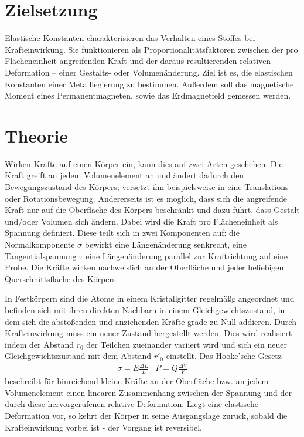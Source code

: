 \section{Zielsetzung}
Elastische Konstanten charakterisieren das Verhalten eines Stoffes bei Krafteinwirkung.
 Sie funktionieren als Proportionalitätsfaktoren zwischen der pro Flächeneinheit angreifenden Kraft und der daraus resultierenden relativen Deformation -- einer Gestalts- oder Volumenänderung. 
Ziel ist es, die elastischen Konstanten einer Metalllegierung zu bestimmen. Außerdem soll das magnetische Moment eines Permanentmagneten, sowie das Erdmagnetfeld gemessen werden.
\section{Theorie}
\label{sec:Theorie}
Wirken Kräfte auf einen Körper ein, kann dies auf zwei Arten geschehen. Die Kraft greift an jedem Volumenelement an und ändert dadurch den Bewegungszustand des Körpers; versetzt ihn beispielsweise in eine Translations- oder Rotationsbewegung. 
Andererseits ist es möglich, dass sich die angreifende Kraft nur auf die Oberfläche des Körpers beschränkt und dazu führt, dass Gestalt und/oder Volumen sich ändern. 
Dabei wird die Kraft pro Flächeneinheit als Spannung definiert. 
Diese teilt sich in zwei Komponenten auf: die Normalkomponente $\sigma$ bewirkt eine Längenänderung senkrecht, eine Tangentialspannung $\tau$ eine Längenänderung parallel zur Kraftrichtung auf eine Probe. 
Die Kräfte wirken nachweislich an der Oberfläche und jeder beliebigen Querschnittsfläche des Körpers. 

In Festkörpern sind die Atome in einem Kristallgitter regelmäßg angeordnet und befinden sich mit ihren direkten Nachbarn in einem Gleichgewichtszustand, in dem sich die abstoßenden und anziehenden Kräfte grade zu Null addieren. 
Durch Krafteinwirkung muss ein neuer Zustand hergestellt werden. 
Dies wird realisiert indem der Abstand $r_0$ der Teilchen zueinander variiert wird und sich ein neuer Gleichgewichtszustand mit dem Abstand $r'_0$ einstellt.
Das Hooke'sche Gesetz
\begin{align}
\sigma=E\frac{\Delta{L}}{L}  & P=Q\frac{\Delta{V}}{V}
\label{eq:hooke}
\end{align}
beschreibt für hinreichend kleine Kräfte an der Oberfläche bzw. an jedem Volumenelement einen linearen Zusammenhang zwischen der Spannung und der durch diese hervorgerufenen relative Deformation.
Liegt eine elastische Deformation vor, so kehrt der Körper in seine Ausgangslage zurück, sobald die Krafteinwirkung vorbei ist - der Vorgang ist reversibel. 





